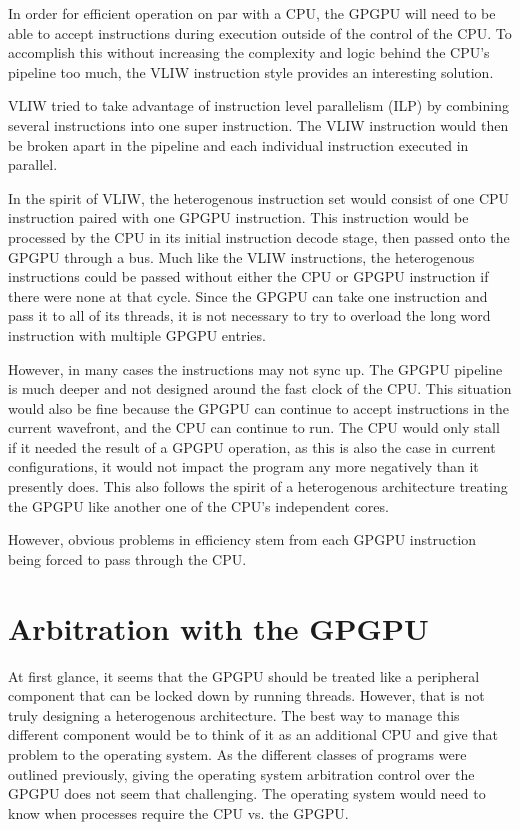 In order for efficient operation on par with a CPU, the GPGPU will need to be able to accept instructions during execution outside of the control of the CPU. To accomplish this without increasing the complexity and logic behind the CPU's pipeline too much, the VLIW instruction style provides an interesting solution. 

VLIW tried to take advantage of instruction level parallelism (ILP) by combining several instructions into one super instruction. The VLIW instruction would then be broken apart in the pipeline and each individual instruction executed in parallel. 

In the spirit of VLIW, the heterogenous instruction set would consist of one CPU instruction paired with one GPGPU instruction. This instruction would be processed by the CPU in its initial instruction decode stage, then passed onto the GPGPU through a bus. Much like the VLIW instructions, the heterogenous instructions could be passed without either the CPU or GPGPU instruction if there were none at that cycle. Since the GPGPU can take one instruction and pass it to all of its threads, it is not necessary to try to overload the long word instruction with multiple GPGPU entries.

However, in many cases the instructions may not sync up. The GPGPU pipeline is much deeper and not designed around the fast clock of the CPU. This situation would also be fine because the GPGPU can continue to accept instructions in the current wavefront, and the CPU can continue to run. The CPU would only stall if it needed the result of a GPGPU operation, as this is also the case in current configurations, it would not impact the program any more negatively than it presently does. This also follows the spirit of a heterogenous architecture treating the GPGPU like another one of the CPU's independent cores. 

However, obvious problems in efficiency stem from each GPGPU instruction being forced to pass through the CPU. 


\section*{Arbitration with the GPGPU}

At first glance, it seems that the GPGPU should be treated like a peripheral component that can be locked down by running threads. However, that is not truly designing a heterogenous architecture. The best way to manage this different component would be to think of it as an additional CPU and give that problem to the operating system. As the different classes of programs were outlined previously, giving the operating system arbitration control over the GPGPU does not seem that challenging. The operating system would need to know when processes require the CPU vs. the GPGPU. 









